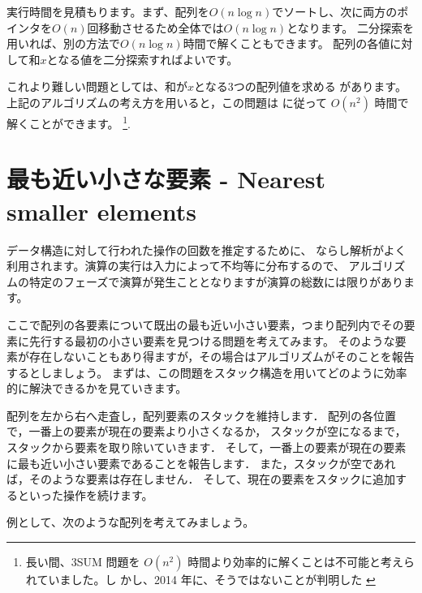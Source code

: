 実行時間を見積もります。まず、配列を$O(n \log n)$でソートし、次に両方のポインタを$O(n)$回移動させるため全体では$O(n \log n)$となります。
二分探索を用いれば、別の方法で$O(n \log n)$時間で解くこともできます。
配列の各値に対して和$x$となる値を二分探索すればよいです。

これより難しい問題としては、和が$x$となる3つの配列値を求める があります。
上記のアルゴリズムの考え方を用いると，この問題は に従って $O(n^2)$ 時間で解くことができます。
\footnote{長い間、3SUM 問題を $O(n^2)$ 時間より効率的に解くことは不可能と考えられていました。し
かし、2014 年に、そうではないことが判明した \cite{gro14} }.

\section{最も近い小さな要素 - Nearest smaller elements}


データ構造に対して行われた操作の回数を推定するために、
ならし解析がよく利用されます。演算の実行は入力によって不均等に分布するので、
アルゴリズムの特定のフェーズで演算が発生こととなりますが演算の総数には限りがあります。

ここで配列の各要素について既出の最も近い小さい要素，つまり配列内でその要素に先行する最初の小さい要素を見つける問題を考えてみます。
そのような要素が存在しないこともあり得ますが，その場合はアルゴリズムがそのことを報告するとしましょう。
まずは、この問題をスタック構造を用いてどのように効率的に解決できるかを見ていきます。

配列を左から右へ走査し，配列要素のスタックを維持します．
配列の各位置で，一番上の要素が現在の要素より小さくなるか，
スタックが空になるまで，スタックから要素を取り除いていきます．
そして，一番上の要素が現在の要素に最も近い小さい要素であることを報告します．
また，スタックが空であれば，そのような要素は存在しません．
そして、現在の要素をスタックに追加するといった操作を続けます。

例として、次のような配列を考えてみましょう。

\begin{center}
\end{center}

